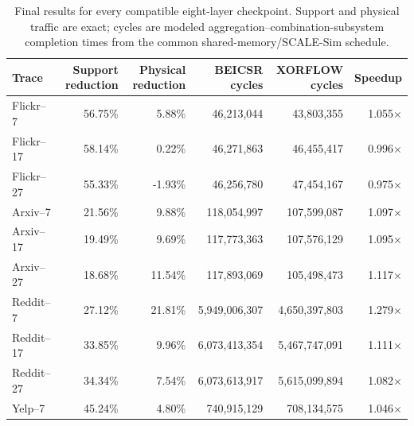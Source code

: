 \documentclass[10pt,conference]{IEEEtran}
\begin{document}
\begin{table}[t]
\centering
\caption{Final results for every compatible eight-layer checkpoint. Support and physical traffic are exact; cycles are modeled aggregation--combination-subsystem completion times from the common shared-memory/SCALE-Sim schedule.}
\label{tab:s-checkpoints}
\scriptsize
\setlength{\tabcolsep}{4pt}
\begin{tabular}{lrrrrr}
\toprule
Trace & Support reduction & Physical reduction & BEICSR cycles & XORFLOW cycles & Speedup \\
\midrule
Flickr--7 & 56.75\% & 5.88\% & 46,213,044 & 43,803,355 & 1.055$\times$ \\
Flickr--17 & 58.14\% & 0.22\% & 46,271,863 & 46,455,417 & 0.996$\times$ \\
Flickr--27 & 55.33\% & -1.93\% & 46,256,780 & 47,454,167 & 0.975$\times$ \\
Arxiv--7 & 21.56\% & 9.88\% & 118,054,997 & 107,599,087 & 1.097$\times$ \\
Arxiv--17 & 19.49\% & 9.69\% & 117,773,363 & 107,576,129 & 1.095$\times$ \\
Arxiv--27 & 18.68\% & 11.54\% & 117,893,069 & 105,498,473 & 1.117$\times$ \\
Reddit--7 & 27.12\% & 21.81\% & 5,949,006,307 & 4,650,397,803 & 1.279$\times$ \\
Reddit--17 & 33.85\% & 9.96\% & 6,073,413,354 & 5,467,747,091 & 1.111$\times$ \\
Reddit--27 & 34.34\% & 7.54\% & 6,073,613,917 & 5,615,099,894 & 1.082$\times$ \\
Yelp--7 & 45.24\% & 4.80\% & 740,915,129 & 708,134,575 & 1.046$\times$ \\
\bottomrule
\end{tabular}
\end{table}
\end{document}
